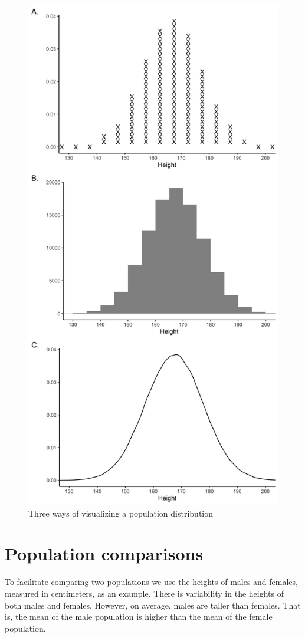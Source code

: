 \documentclass[
]{krantz}
\begin{document}
\begin{figure}
\includegraphics[width=0.8\linewidth,height=0.8\textheight]{ch_populations/images/popvisual} \caption{Three ways of visualizing a population distribution}\label{fig:popvisual3}
\end{figure}

\hypertarget{population-comparisons}{%
\section{Population comparisons}\label{population-comparisons}}

To facilitate comparing two populations we use the heights of males and females, measured in centimeters, as an example. There is variability in the heights of both males and females. However, on average, males are taller than females. That is, the mean of the male population is higher than the mean of the female population.
\end{document}
